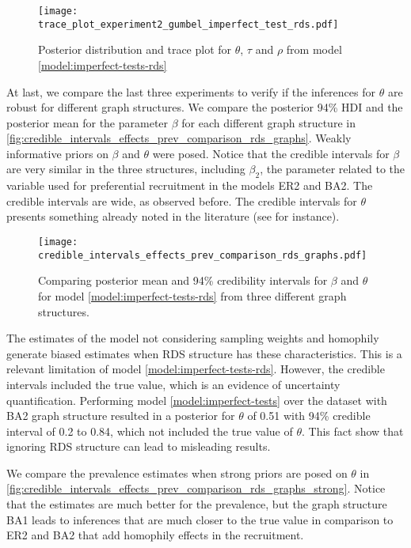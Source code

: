 \begin{figure}[htb]
  \centering
  \caption{\label{fig:trace_plot_experiment2_gumbel_imperfect_test_rds}Posterior
  distribution and trace plot for $\theta$, $\tau$ and $\rho$ from model 
  \eqref{model:imperfect-tests-rds}}
  \texttt{[image: trace\_plot\_experiment2\_gumbel\_imperfect\_test\_rds.pdf]}
\end{figure}

At last, we compare the last three experiments to verify if the inferences for
$\theta$ are robust for different graph structures. We compare the posterior
94\% HDI and the posterior mean for the parameter $\beta$ for each different
graph structure in
\autoref{fig:credible_intervals_effects_prev_comparison_rds_graphs}. Weakly
informative priors on $\beta$ and $\theta$ were posed. Notice that the
credible intervals for $\beta$ are very similar in the three structures,
including $\beta_2$, the parameter related to the variable used for
preferential recruitment in the models ER2 and BA2. The credible intervals are
wide, as observed before. The credible intervals for $\theta$ presents
something already noted in the literature (see \cite{gile2018methods} for
instance). 

\begin{figure}[htb]
  \centering
  \caption{\label{fig:credible_intervals_effects_prev_comparison_rds_graphs}Comparing
  posterior mean and 94\% credibility intervals for $\beta$ and $\theta$ for model
  \eqref{model:imperfect-tests-rds} from three different graph structures.}
  \texttt{[image: credible\_intervals\_effects\_prev\_comparison\_rds\_graphs.pdf]}
\end{figure}

The estimates of the model not considering sampling weights and
homophily generate biased estimates when RDS structure has these characteristics.
This is a relevant limitation of model \eqref{model:imperfect-tests-rds}. However, the credible intervals
included the true value, which is an evidence of uncertainty quantification. Performing model \eqref{model:imperfect-tests} over the dataset with BA2 graph
structure resulted in a posterior for $\theta$ of 0.51 with 94\% credible
interval of 0.2 to 0.84, which not included the true value of $\theta$. This
fact show that ignoring RDS structure can lead to misleading results. 

We compare the prevalence estimates when strong priors are posed on $\theta$
in \autoref{fig:credible_intervals_effects_prev_comparison_rds_graphs_strong}.
Notice that the estimates are much better for the prevalence, but the graph structure
BA1 leads to inferences that are much closer to the true value in comparison
to ER2 and BA2 that add homophily effects in the recruitment.

